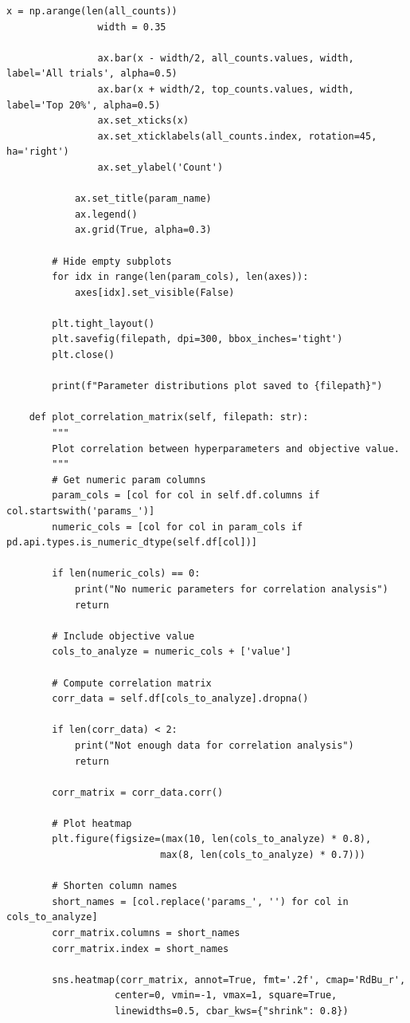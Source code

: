 \begin{lstlisting}[style=python, caption=Comprehensive HPO analysis and visualization]
                x = np.arange(len(all_counts))
                width = 0.35

                ax.bar(x - width/2, all_counts.values, width, label='All trials', alpha=0.5)
                ax.bar(x + width/2, top_counts.values, width, label='Top 20%', alpha=0.5)
                ax.set_xticks(x)
                ax.set_xticklabels(all_counts.index, rotation=45, ha='right')
                ax.set_ylabel('Count')

            ax.set_title(param_name)
            ax.legend()
            ax.grid(True, alpha=0.3)

        # Hide empty subplots
        for idx in range(len(param_cols), len(axes)):
            axes[idx].set_visible(False)

        plt.tight_layout()
        plt.savefig(filepath, dpi=300, bbox_inches='tight')
        plt.close()

        print(f"Parameter distributions plot saved to {filepath}")

    def plot_correlation_matrix(self, filepath: str):
        """
        Plot correlation between hyperparameters and objective value.
        """
        # Get numeric param columns
        param_cols = [col for col in self.df.columns if col.startswith('params_')]
        numeric_cols = [col for col in param_cols if pd.api.types.is_numeric_dtype(self.df[col])]

        if len(numeric_cols) == 0:
            print("No numeric parameters for correlation analysis")
            return

        # Include objective value
        cols_to_analyze = numeric_cols + ['value']

        # Compute correlation matrix
        corr_data = self.df[cols_to_analyze].dropna()

        if len(corr_data) < 2:
            print("Not enough data for correlation analysis")
            return

        corr_matrix = corr_data.corr()

        # Plot heatmap
        plt.figure(figsize=(max(10, len(cols_to_analyze) * 0.8),
                           max(8, len(cols_to_analyze) * 0.7)))

        # Shorten column names
        short_names = [col.replace('params_', '') for col in cols_to_analyze]
        corr_matrix.columns = short_names
        corr_matrix.index = short_names

        sns.heatmap(corr_matrix, annot=True, fmt='.2f', cmap='RdBu_r',
                   center=0, vmin=-1, vmax=1, square=True,
                   linewidths=0.5, cbar_kws={"shrink": 0.8})


\end{lstlisting}
